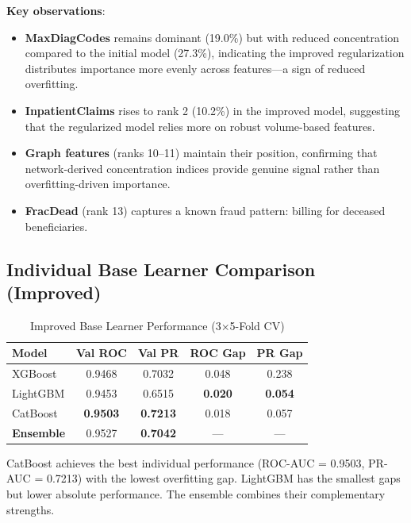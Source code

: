 \documentclass[conference]{IEEEtran}
\begin{document}
\textbf{Key observations}:
\begin{itemize}[leftmargin=*]
    \item \textbf{MaxDiagCodes} remains dominant (19.0\%) but with reduced concentration compared to the initial model (27.3\%), indicating the improved regularization distributes importance more evenly across features---a sign of reduced overfitting.
    \item \textbf{InpatientClaims} rises to rank 2 (10.2\%) in the improved model, suggesting that the regularized model relies more on robust volume-based features.
    \item \textbf{Graph features} (ranks 10--11) maintain their position, confirming that network-derived concentration indices provide genuine signal rather than overfitting-driven importance.
    \item \textbf{FracDead} (rank 13) captures a known fraud pattern: billing for deceased beneficiaries.
\end{itemize}

\subsection{Individual Base Learner Comparison (Improved)}

\begin{table}[h]
\caption{Improved Base Learner Performance (3$\times$5-Fold CV)}
\label{tab:base_learners}
\centering
\small
\begin{tabular}{@{}lcccc@{}}
\toprule
\textbf{Model} & \textbf{Val ROC} & \textbf{Val PR} & \textbf{ROC Gap} & \textbf{PR Gap} \\
\midrule
XGBoost & 0.9468 & 0.7032 & 0.048 & 0.238 \\
LightGBM & 0.9453 & 0.6515 & \textbf{0.020} & \textbf{0.054} \\
CatBoost & \textbf{0.9503} & \textbf{0.7213} & 0.018 & 0.057 \\
\midrule
\textbf{Ensemble} & 0.9527 & \textbf{0.7042} & --- & --- \\
\bottomrule
\end{tabular}
\vspace{-1mm}
\end{table}

CatBoost achieves the best individual performance (ROC-AUC = 0.9503, PR-AUC = 0.7213) with the lowest overfitting gap. LightGBM has the smallest gaps but lower absolute performance. The ensemble combines their complementary strengths.
\end{document}
